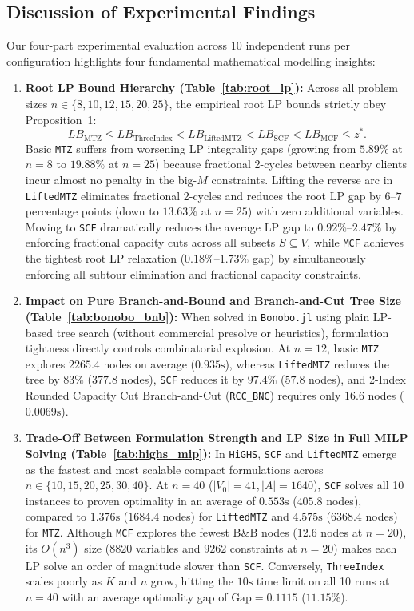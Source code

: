 \documentclass[11pt,a4paper]{article}
\begin{document}
\subsection{Discussion of Experimental Findings}
Our four-part experimental evaluation across 10 independent runs per configuration highlights four fundamental mathematical modelling insights:
\begin{enumerate}[noitemsep,topsep=3pt]
    \item \textbf{Root LP Bound Hierarchy (Table~\ref{tab:root_lp}):} Across all problem sizes $n \in \{8, 10, 12, 15, 20, 25\}$, the empirical root LP bounds strictly obey Proposition~1:
    \[
    LB_{\text{MTZ}} \le LB_{\text{ThreeIndex}} < LB_{\text{LiftedMTZ}} < LB_{\text{SCF}} < LB_{\text{MCF}} \le z^*.
    \]
    Basic \texttt{MTZ} suffers from worsening LP integrality gaps (growing from $5.89\%$ at $n=8$ to $19.88\%$ at $n=25$) because fractional 2-cycles between nearby clients incur almost no penalty in the big-$M$ constraints. Lifting the reverse arc in \texttt{LiftedMTZ} eliminates fractional 2-cycles and reduces the root LP gap by $6\text{--}7$ percentage points (down to $13.63\%$ at $n=25$) with zero additional variables. Moving to \texttt{SCF} dramatically reduces the average LP gap to $0.92\%\text{--}2.47\%$ by enforcing fractional capacity cuts across all subsets $S \subseteq V$, while \texttt{MCF} achieves the tightest root LP relaxation ($0.18\%\text{--}1.73\%$ gap) by simultaneously enforcing all subtour elimination and fractional capacity constraints.
    \item \textbf{Impact on Pure Branch-and-Bound and Branch-and-Cut Tree Size (Table~\ref{tab:bonobo_bnb}):} When solved in \texttt{Bonobo.jl} using plain LP-based tree search (without commercial presolve or heuristics), formulation tightness directly controls combinatorial explosion. At $n = 12$, basic \texttt{MTZ} explores $2265.4$ nodes on average ($0.935\text{s}$), whereas \texttt{LiftedMTZ} reduces the tree by $83\%$ ($377.8$ nodes), \texttt{SCF} reduces it by $97.4\%$ ($57.8$ nodes), and 2-Index Rounded Capacity Cut Branch-and-Cut (\texttt{RCC\_BNC}) requires only $16.6$ nodes ($0.0069\text{s}$).
    \item \textbf{Trade-Off Between Formulation Strength and LP Size in Full MILP Solving (Table~\ref{tab:highs_mip}):} In \texttt{HiGHS}, \texttt{SCF} and \texttt{LiftedMTZ} emerge as the fastest and most scalable compact formulations across $n \in \{10, 15, 20, 25, 30, 40\}$. At $n = 40$ ($|V_0|=41, |A|=1640$), \texttt{SCF} solves all 10 instances to proven optimality in an average of $0.553\text{s}$ ($405.8$ nodes), compared to $1.376\text{s}$ ($1684.4$ nodes) for \texttt{LiftedMTZ} and $4.575\text{s}$ ($6368.4$ nodes) for \texttt{MTZ}. Although \texttt{MCF} explores the fewest B\&B nodes ($12.6$ nodes at $n=20$), its $O(n^3)$ size ($8820$ variables and $9262$ constraints at $n=20$) makes each LP solve an order of magnitude slower than \texttt{SCF}. Conversely, \texttt{ThreeIndex} scales poorly as $K$ and $n$ grow, hitting the $10\text{s}$ time limit on all 10 runs at $n = 40$ with an average optimality gap of $\text{Gap} = 0.1115$ ($11.15\%$).

\end{enumerate}
\end{document}

